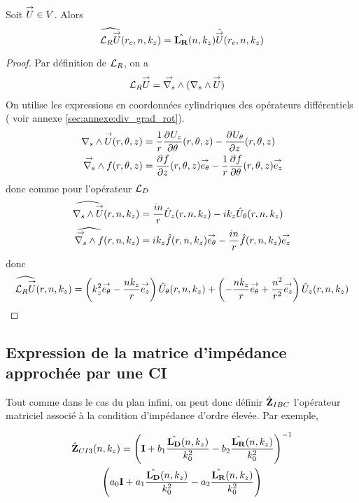     \begin{prop}
      Soit \(\vect{U} \in V\).
      Alors
      \begin{equation*}
        \widehat{\LR \vect{U}} (r_c,n,k_z) = \hat{\mLR}(n,k_z) \hat{\vect{U}}(r_c,n,k_z)
      \end{equation*}
    \end{prop}

    \begin{proof}
      Par définition de \(\LR\), on a
      \begin{align*}
        \LR \vect{U} & = \vrots{} (\rots{} \vect{U})
      \end{align*}
      On utilise les expressions en coordonnées cylindriques des opérateurs différentiels ( voir annexe \ref{sec:annexe:div_grad_rot}).
      \begin{align*}
        \rots{\vect{U}}(r,\theta,z) &= \frac{1}{r}\ddr{\theta}{U_z}(r,\theta,z) - \ddr{z}{U_\theta}(r,\theta,z)
        \\
        \vrots{f}(r,\theta,z) &= \ddr{z}{f}(r,\theta,z)\vect{e_\theta} - \frac{1}{r}\ddr{\theta}{f}(r,\theta,z)\vect{e_z}
      \end{align*}
      donc comme pour l'opérateur \(\LD\)
      \begin{align*}
        \widehat{\rots{\vect{U}}}(r,n,k_z) &= \frac{in}{r}{\hat{U}_z}(r,n,k_z) - ik_z{\hat{U}_\theta}(r,n,k_z)
        \\
        \widehat{\vrots{f}}(r,n,k_z) &=  ik_z\hat{f}(r,n,k_z)\vect{e_\theta} - \frac{in}{r}\hat{f}(r,n,k_z)\vect{e_z}
      \end{align*}
      donc
      \begin{align*}
        \widehat{\LR{\vect{U}}}(r,n,k_z) =  \left({k_z^2}\vect{e_\theta} - \frac{nk_z}{r}\vect{e_z}\right){\hat{U}_\theta}(r,n,k_z) + \left(-\frac{nk_z}{r}\vect{e_\theta} + \frac{n^2}{r^2}\vect{e_z}\right){\hat{U}_z}(r,n,k_z)
      \end{align*}

    \end{proof}

  \subsection{Expression de la matrice d'impédance approchée par une CI}

    Tout comme dans le cas du plan infini, on peut donc définir \(\hat{\mZ}_{IBC}\) l’opérateur matriciel associé à la condition d'impédance d'ordre élevée. Par exemple,

    \begin{multline}
      \label{eq:cylindre:hoibc:ci3}
      \hat{\mZ}_{CI3}(n,k_z) = \left(\mI + b_1 \frac{\hat{\mLD}(n,k_z)}{k_0^2} - b_2 \frac{\hat{\mLR}(n,k_z)}{k_0^2} \right)^{-1}\\\left(a_0 \mI + a_1 \frac{\hat{\mLD}(n,k_z)}{k_0^2} - a_2 \frac{\hat{\mLR}(n,k_z)}{k_0^2}\right)
    \end{multline}

